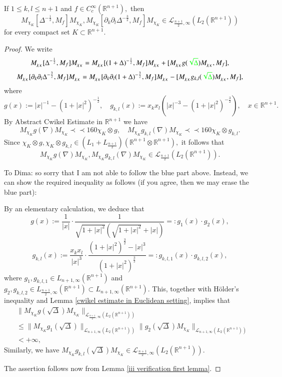 \documentclass[12pt]{amsart}
\begin{document}
\begin{lemma}\label{iii verification second lemma} If $1\leq k,l\leq n+1$ and $f\in C^{\infty}_c(\mathbb{R}^{n+1}),$ then
$$M_{\chi_K}[\Delta^{-\frac12},M_f]M_{\chi_K},M_{\chi_K}[\partial_k\partial_l\Delta^{-\frac32},M_f]M_{\chi_K}\in \mathcal{L}_{\frac{n+1}{2},\infty}(L_2(\mathbb{R}^{n+1}))$$
for every compact set $K\subset\mathbb{R}^{n+1}.$
\end{lemma}
\begin{proof} We write
$$M_{\chi_K}[\Delta^{-\frac12},M_f]M_{\chi_K}=M_{\chi_K}[(1+\Delta)^{-\frac12},M_f]M_{\chi_K}+[M_{\chi_K}g({\color{green}\sqrt{\Delta}
})M_{\chi_K},M_f],$$
$$M_{\chi_K}[\partial_k\partial_l\Delta^{-\frac32},M_f]M_{\chi_K}=M_{\chi_K}[\partial_k\partial_l(1+\Delta)^{-\frac32},M_f]M_{\chi_K}-[M_{\chi_K}g_{k,l}({\color{green}\sqrt{\Delta}})M_{\chi_K},M_f],$$		
where
$$g(x):=|x|^{-1}-(1+|x|^2)^{-\frac12},\quad g_{k,l}(x):=x_kx_l(|x|^{-3}-(1+|x|^2)^{-\frac32}),\quad x\in\mathbb{R}^{n+1}.$$
{\color{blue}By Abstract Cwikel Estimate in $\mathbb{R}^{n+1}$ we have
$$M_{\chi_K}g(\nabla)M_{\chi_K}\prec\prec 160\chi_K\otimes g,\quad M_{\chi_K}g_{k,l}(\nabla)M_{\chi_K}\prec\prec 160\chi_K\otimes g_{k,l}.$$
Since $\chi_K\otimes g,\chi_K\otimes g_{k,l}\in (L_1+L_{\frac{n+1}{2}})(\mathbb{R}^{n+1}\otimes\mathbb{R}^{n+1}),$ it follows that
$$M_{\chi_K}g(\nabla)M_{\chi_K},M_{\chi_K}g_{k,l}(\nabla)M_{\chi_K}\in\mathcal{L}_{\frac{n+1}{2}}(L_2(\mathbb{R}^{n+1})).$$}
{\color{red}To Dima: so sorry that I am not able to follow the blue part above. Instead, we can show the required inequality as follows (if you agree, then we may erase the blue part):

By an elementary calculation, we deduce that
$$g(x):=\frac{1}{|x|}\cdot\frac{1}{\sqrt{1+|x|^2}(\sqrt{1+|x|^2}+|x|)}=:g_1(x)\cdot g_2(x),$$
$$g_{k,l}(x):=\frac{x_kx_l}{|x|^3}\cdot\frac{(1+|x|^2)^{\frac32}-|x|^3}{(1+|x|^2)^{\frac32}}=:g_{k,l,1}(x)\cdot g_{k,l,2}(x),$$
where $g_1,g_{k,l,1}\in L_{n+1,\infty}(\mathbb{R}^{n+1})$ and $g_2,g_{k,l,2}\in L_{\frac{n+1}{2},\infty}(\mathbb{R}^{n+1})\subset L_{n+1,\infty}(\mathbb{R}^{n+1})$. This, together with H\"{o}lder's inequality and Lemma \ref{cwikel estimate in Euclidean setting}, implies that
\begin{align*}
&\|M_{\chi_K}g(\sqrt{\Delta})M_{\chi_K}\|_{\mathcal{L}_{\frac{n+1}{2},\infty}(L_2(\mathbb{R}^{n+1}))}\\&\leq \|M_{\chi_K}g_1(\sqrt{\Delta})\|_{\mathcal{L}_{n+1,\infty}(L_2(\mathbb{R}^{n+1}))}\|g_2(\sqrt{\Delta})M_{\chi_K}\|_{\mathcal{L}_{n+1,\infty}(L_2(\mathbb{R}^{n+1}))}\\
&<+\infty,
\end{align*}
Similarly, we have $M_{\chi_K}g_{k,l}(\sqrt{\Delta})M_{\chi_K}\in \mathcal{L}_{\frac{n+1}{2},\infty}(L_2(\mathbb{R}^{n+1}))$.
}
The assertion follows now from Lemma \ref{iii verification first lemma}.
\end{proof}
\end{document}
